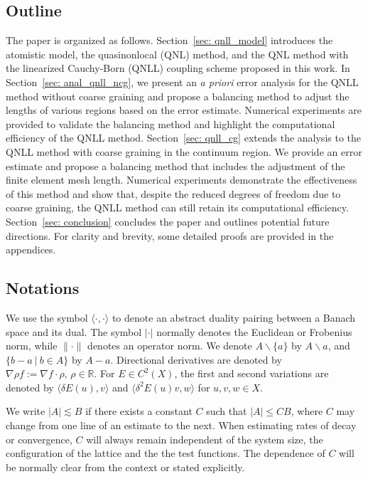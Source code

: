 \subsection{Outline}
\label{sec: outline}

The paper is organized as follows. Section~\ref{sec: qnll_model} introduces the atomistic model, the quasinonlocal (QNL) method, and the QNL method with the linearized Cauchy-Born (QNLL) coupling scheme proposed in this work. In Section~\ref{sec: anal_qnll_ncg}, we present an {\it a priori} error analysis for the QNLL method without coarse graining and propose a balancing method to adjust the lengths of various regions based on the error estimate. Numerical experiments are provided to validate the balancing method and highlight the computational efficiency of the QNLL method. Section~\ref{sec: qnll_cg} extends the analysis to the QNLL method with coarse graining in the continuum region. We provide an error estimate and propose a balancing method that includes the adjustment of the finite element mesh length. Numerical experiments demonstrate the effectiveness of this method and show that, despite the reduced degrees of freedom due to coarse graining, the QNLL method can still retain its computational efficiency. Section~\ref{sec: conclusion}  concludes the paper and outlines potential future directions. For clarity and brevity, some detailed proofs are provided in the appendices.



\subsection{Notations}
\label{sec: notations}
We use the symbol $\langle\cdot,\cdot\rangle$ to denote an abstract duality
pairing between a Banach space and its dual. The symbol $|\cdot|$ normally
denotes the Euclidean or Frobenius norm, while $\|\cdot\|$ denotes an operator
norm. We denote $A\backslash\{a\}$ by
$A\backslash a$, and $\{b-a~\vert ~b\in A\}$ by $A-a$. Directional derivatives are denoted by $\nabla \rho f := \nabla f\cdot\rho,\, \rho \in \mathbb{R}$. For $E \in C^2(X)$, the first and second variations are denoted by
$\langle\delta E(u), v\rangle$ and $\langle\delta^2 E(u) v, w\rangle$ for $u,v,w\in X$.

We write $|A| \lesssim B$ if there exists a constant $C$ such that $|A|\leq CB$, where $C$ may change from one line of an estimate to the next. When estimating rates of decay or convergence, $C$ will always remain independent of the system size, the configuration of the lattice and the the test functions. The dependence of $C$ will be normally clear from the context or stated explicitly. 

